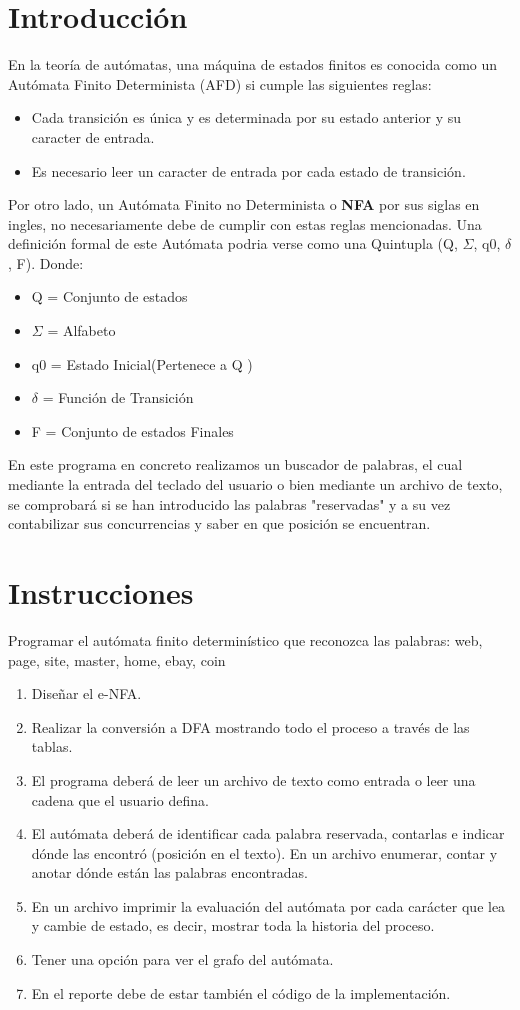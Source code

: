 \documentclass{article}
\begin{document}
	\section*{Introducción}
	En la teoría de autómatas, una máquina de estados finitos es conocida como un Autómata Finito Determinista (AFD) si cumple las siguientes reglas:
	\begin{itemize}
	\item Cada transición es única y es determinada por su estado anterior y su caracter de entrada.
	\item Es necesario leer un caracter de entrada por cada estado de transición.
	\end{itemize}	
	Por otro lado, un Autómata Finito no Determinista o \textbf{NFA} por sus siglas en ingles, no necesariamente debe de cumplir con estas reglas mencionadas. 	
	Una definición formal de este Autómata podria verse como una Quintupla (Q, $\Sigma$, q0, $\delta$, F). Donde:
	\begin{itemize}
		\item Q = Conjunto de estados
		\item $\Sigma$ = Alfabeto
		\item q0 = Estado Inicial(Pertenece a Q	) 
		\item $\delta$ = Función de Transición
		\item F = Conjunto de estados Finales		
	\end{itemize}	
	En este programa en concreto realizamos un buscador de palabras, el cual mediante la entrada del teclado del usuario o bien mediante un archivo de texto, se comprobará si se han introducido las palabras "reservadas" y a su vez contabilizar sus concurrencias y saber en que posición se encuentran.	

	\section*{Instrucciones}
	Programar el autómata finito determinístico que reconozca las palabras:	
	web, page, site, master, home, ebay, coin
	\begin{enumerate}
		\item Diseñar el e-NFA.
		\item Realizar la conversión a DFA mostrando todo el proceso a través de las tablas.
		\item El programa deberá de leer un archivo de texto como entrada o leer una cadena que el usuario defina.
		\item El autómata deberá de identificar cada palabra reservada, contarlas e indicar dónde las encontró (posición en el texto). En un archivo enumerar, contar y anotar dónde están las palabras encontradas.
		\item En un archivo imprimir la evaluación del autómata por cada carácter que lea y cambie de estado, es decir, mostrar toda la historia del proceso.
		\item Tener una opción para ver el grafo del autómata.
		\item En el reporte debe de estar también el código de la implementación.			
	\end{enumerate}
\end{document}
